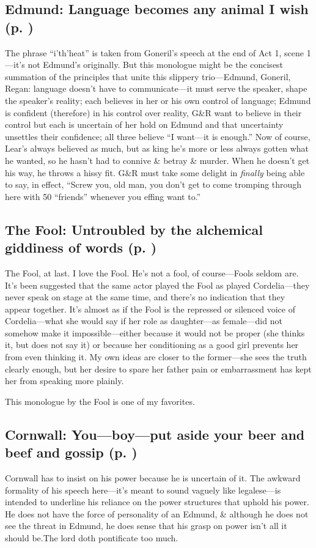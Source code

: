 \subsection{Edmund: Language becomes any animal I wish (p. \pageref{ch:lear_ai})}
The phrase ``i'th'heat'' is taken from Goneril's speech at the end of Act 1, scene 1---it's not Edmund's originally. But this monologue might be the concisest summation of the principles that unite this slippery trio---Edmund, Goneril, Regan: language doesn't have to communicate---it must serve the speaker, shape the speaker's reality; each believes in her or his own control of language; Edmund is confident (therefore) in his control over reality, G\&R want to believe in their control but each is uncertain of her hold on Edmund and that uncertainty unsettles their confidence; all three believe ``I want---it is enough.'' Now of course, Lear's always believed as much, but as king he's more or less always gotten what he wanted, so he hasn't had to connive \& betray \& murder. When he doesn't get his way, he throws a hissy fit. G\&R must take some delight in \emph{finally} being able to say, in effect, ``Screw you, old man, you don't get to come tromping through here with 50 ``friends'' whenever you effing want to.''

\subsection{The Fool: Untroubled by the alchemical giddiness of words (p. \pageref{ch:lear_aj})}
The Fool, at last. I love the Fool. He's not a fool, of course---Fools seldom are. It's been suggested that the same actor played the Fool as played Cordelia---they never speak on stage at the same time, and there's no indication that they appear together. It's almost as if the Fool is the repressed or silenced voice of Cordelia---what she would say if her role as daughter---as female---did not somehow make it impossible---either because it would not be proper (she thinks it, but does not say it) or because her conditioning as a good girl prevents her from even thinking it. My own ideas are closer to the former---she sees the truth clearly enough, but her desire to spare her father pain or embarrassment has kept her from speaking more plainly.

This monologue by the Fool is one of my favorites.

\subsection{Cornwall: You---boy---put aside your beer and beef and gossip (p. \pageref{ch:lear_ak})}
Cornwall has to insist on his power because he is uncertain of it. The awkward formality of his speech here---it's meant to sound vaguely like legalese---is intended to underline his reliance on the power structures that uphold his power. He does not have the force of personality of an Edmund, \& although he does not see the threat in Edmund, he does sense that his grasp on power isn't all it should be.The lord doth pontificate too much.

